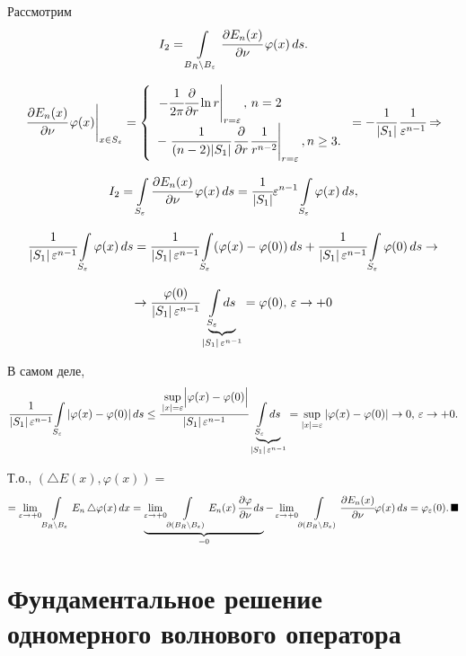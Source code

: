 \documentclass[unicode,12pt,draft]{article}
\begin{document}
Рассмотрим $$I_2=\int\limits_{B_R\setminus
B_{\varepsilon}}\cfrac{\partial E_n(x)}{\partial
\nu}\,\varphi(x)\,ds.$$

$$\left.\cfrac{\partial E_n(x)}{\partial
\nu}\,\varphi(x)\right|_{x\in S_{\varepsilon}}=
\left\{%
\begin{array}{ll}
    \left.-\cfrac1{2\pi} \cfrac {\partial}{\partial r}\ln r\right|_{r=\varepsilon},\,n=2  \\

    -\left.\cfrac1{(n-2)|S_1|}\,\cfrac {\partial}{\partial r}\,\cfrac1{r^{n-2}}\right|_{r=\varepsilon},
     n\ge3. \\
\end{array}%
\right.= -\cfrac1{|S_1|}\,\cfrac1{\varepsilon^{n-1}} \Rightarrow$$

$$I_2=\int\limits_{S_\varepsilon}\cfrac{\partial E_n(x)}{\partial
\nu}\,\varphi(x)\,ds=
\cfrac1{|S_1|}\varepsilon^{n-1}\int\limits_{S_\varepsilon}\varphi(x)\,ds,$$

$$\cfrac1{|S_1|\,\varepsilon^{n-1}}\int\limits_{S_\varepsilon}\varphi(x)\,ds=
\cfrac1{|S_1|\,\varepsilon^{n-1}}\int\limits_{S_\varepsilon}(\varphi(x)-\varphi(0))\,ds+
\cfrac1{|S_1|\,\varepsilon^{n-1}}\int\limits_{S_\varepsilon}\varphi(0)\,ds\to$$

$$\to\cfrac{\varphi(0)}{|S_1|\,\varepsilon^{n-1}}
\underbrace{\int\limits_{S_\varepsilon}ds}_{|S_1|\,\varepsilon^{n-1}}=\varphi(0),\,\varepsilon\to+0
$$

В самом деле,
$$\cfrac1{|S_1|\,\varepsilon^{n-1}}\int\limits_{S_\varepsilon}|\varphi(x)-\varphi(0)|\,ds\le
\cfrac{\sup\limits_{|x|=\varepsilon}\Bigl|\varphi(x)-\varphi(0)\Bigr|}{|S_1|\,\varepsilon^{n-1}}
\underbrace{\int\limits_{S_\varepsilon}ds}_{|S_1|\,\varepsilon^{n-1}}=
\sup\limits_{|x|=\varepsilon}|\varphi(x)-\varphi(0)|\to0,\,\varepsilon\to+0.$$

Т.о., $(\triangle E(x),\varphi(x))=$
$$=\lim_{\varepsilon\to+0}\int\limits_{B_R\setminus
B_{\varepsilon}}E_n\,\triangle\varphi(x)\,dx=
\underbrace{\lim_{\varepsilon\to+0}\int\limits_{\partial(B_R\setminus
B_{\varepsilon})}E_n(x)\, \cfrac{\partial \varphi}{\partial
\nu}\,ds}_{=0}-
\lim_{\varepsilon\to+0}\int\limits_{\partial(B_R\setminus
B_{\varepsilon})}\cfrac{\partial E_n(x)}{\partial
\nu}\varphi(x)\,ds=\varphi_{\varepsilon}(0).\,\blacksquare$$


\section{Фундаментальное решение одномерного волнового оператора}
\end{document}
